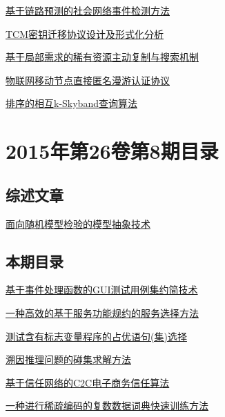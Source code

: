 \documentclass[a4paper]{article}
\begin{document}
\href{http://www.jos.org.cn/ch/reader/download_pdf.aspx?file_no=4703&year_id=2015&quarter_id=9&falg=1}{基于链路预测的社会网络事件检测方法}

\href{http://www.jos.org.cn/ch/reader/download_pdf.aspx?file_no=4719&year_id=2015&quarter_id=9&falg=1}{TCM密钥迁移协议设计及形式化分析}

\href{http://www.jos.org.cn/ch/reader/download_pdf.aspx?file_no=4716&year_id=2015&quarter_id=9&falg=1}{基于局部需求的稀有资源主动复制与搜索机制}

\href{http://www.jos.org.cn/ch/reader/download_pdf.aspx?file_no=4712&year_id=2015&quarter_id=9&falg=1}{物联网移动节点直接匿名漫游认证协议}

\href{http://www.jos.org.cn/ch/reader/download_pdf.aspx?file_no=4704&year_id=2015&quarter_id=9&falg=1}{排序的相互k-Skyband查询算法}


\section{\textbf{2015年第26卷第8期目录}}
\subsection{综述文章}
\href{http://www.jos.org.cn/ch/reader/download_pdf.aspx?file_no=4838&year_id=2015&quarter_id=8&falg=1}{面向随机模型检验的模型抽象技术}

\subsection{本期目录}
\href{http://www.jos.org.cn/ch/reader/download_pdf.aspx?file_no=4711&year_id=2015&quarter_id=8&falg=1}{基于事件处理函数的GUI测试用例集约简技术}

\href{http://www.jos.org.cn/ch/reader/download_pdf.aspx?file_no=4598&year_id=2015&quarter_id=8&falg=1}{一种高效的基于服务功能规约的服务选择方法}

\href{http://www.jos.org.cn/ch/reader/download_pdf.aspx?file_no=4671&year_id=2015&quarter_id=8&falg=1}{测试含有标志变量程序的占优语句(集)选择}

\href{http://www.jos.org.cn/ch/reader/download_pdf.aspx?file_no=4694&year_id=2015&quarter_id=8&falg=1}{溯因推理问题的碰集求解方法}

\href{http://www.jos.org.cn/ch/reader/download_pdf.aspx?file_no=4690&year_id=2015&quarter_id=8&falg=1}{基于信任网络的C2C电子商务信任算法}

\href{http://www.jos.org.cn/ch/reader/download_pdf.aspx?file_no=4677&year_id=2015&quarter_id=8&falg=1}{一种进行稀疏编码的复数数据词典快速训练方法}
\end{document}
